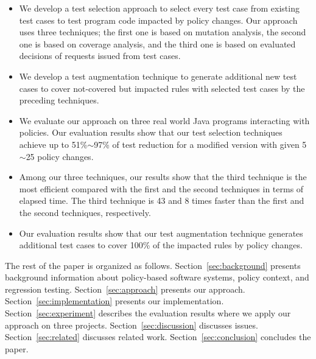 \begin{itemize}
  \item We develop a test selection approach to select every test case from existing test cases to test program code impacted by policy changes. Our approach
  uses three techniques; the first one is based on mutation analysis, the second one is based on coverage analysis, and the third one is based on evaluated 
decisions of requests issued from test cases. 
  \item We develop a test augmentation technique to generate additional new test cases to cover not-covered but impacted rules with selected test cases by the preceding techniques.

  \item We evaluate our approach on three real world Java programs interacting with policies. Our evaluation results show that our test selection techniques achieve
 up to 51\%$\sim$97\% of test reduction for a modified version with given 5$\sim$25 policy changes.
  

  \item Among our three techniques, our results show that the third technique is the most efficient compared with the first
  and the second techniques in terms of elapsed time. The third technique is 43 and 8 times
faster than the first and the second techniques, respectively.
  
  \item Our evaluation results show that our test augmentation technique generates additional test cases to cover 100\% of the impacted rules by policy changes.
\end{itemize}

The rest of the paper is organized as follows.
Section~\ref{sec:background} presents background information about
policy-based software systems, policy context, and regression testing.
Section~\ref{sec:approach} presents our approach.
Section~\ref{sec:implementation} presents our implementation. 
Section~\ref{sec:experiment} describes the evaluation results
where we apply our approach on three projects.
Section~\ref{sec:discussion} discusses issues. 
Section~\ref{sec:related} discusses related
work. Section~\ref{sec:conclusion}
concludes the paper.